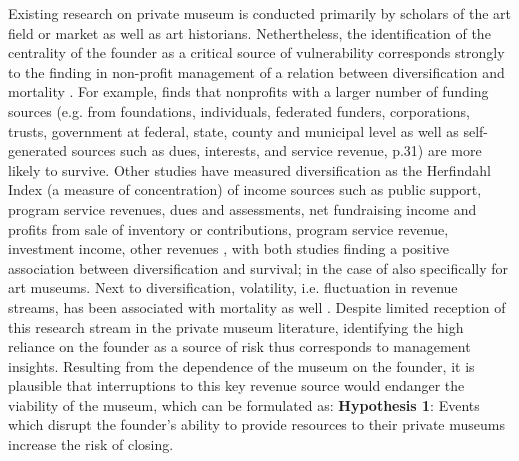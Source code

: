 \documentclass[12pt]{article}
\begin{document}
Existing research on private museum is conducted primarily by scholars of the art field or market as well as art historians.
Nethertheless, the identification of the centrality of the founder as a critical source of vulnerability corresponds strongly to the finding in non-profit management of a relation between diversification and mortality \parencite{Tuckman_Chang_1991_vulnerability}.
For example, \cite{Bielefeld_1994_survival} finds that nonprofits with a larger number of funding sources (e.g. from foundations, individuals, federated funders, corporations, trusts, government at federal, state, county and municipal level as well as self-generated sources such as dues, interests, and service revenue, p.31) are more likely to survive.
Other studies have measured diversification as the Herfindahl Index (a measure of concentration) of income sources such as public support, program service revenues, dues and assessments, net fundraising income and profits from sale of inventory \parencite[p.381]{Hager_2001_vulnerability} or contributions, program service revenue, investment income, other revenues \parencite[p.37]{Lu_Shon_Zhang_2019_dissolution}, with both studies finding a positive association between diversification and survival; in the case of \textcite{Hager_2001_vulnerability} also specifically for art museums.
Next to diversification, volatility, i.e. fluctuation in revenue streams, has been associated with mortality as well \parencite{Mayer_2022_simmer}.
Despite limited reception of this research stream in the private museum literature, identifying the high reliance on the founder as a source of risk thus corresponds to management insights. 
Resulting from the dependence of the museum on the founder, it is plausible that interruptions to this key revenue source would endanger the viability of the museum, which can be formulated as: 
\textbf{Hypothesis 1}: Events which disrupt the founder's ability to provide resources to their private museums increase the risk of closing. 
\end{document}
